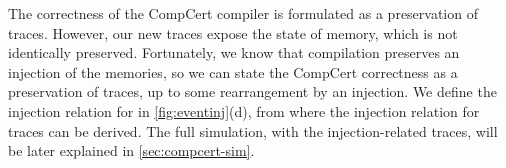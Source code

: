 The correctness of the CompCert compiler is formulated as a preservation of traces. However, our new traces expose the state of memory, which is not identically preserved. Fortunately, we know that compilation preserves an injection of the memories, so we can state the CompCert correctness as a preservation of traces, up to some rearrangement by an injection. 
We define the injection relation for   in \autoref{fig:eventinj}(d), from where the injection relation for traces can be derived. The full simulation, with the injection-related traces, will be later explained in \autoref{sec:compcert-sim}.



